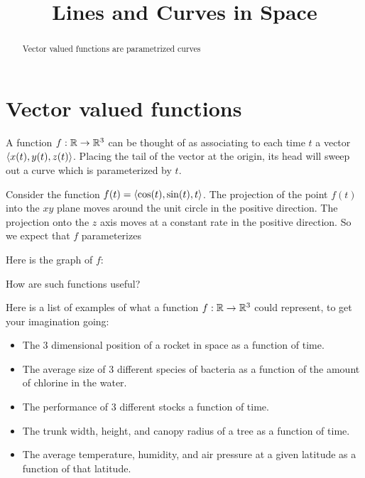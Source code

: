 \documentclass{ximera}
\title[Dig-In:]{Lines and Curves in Space}
\begin{document}
\begin{abstract}
  Vector valued functions are parametrized curves
\end{abstract}
\maketitle

\section{Vector valued functions}

A function $f: \mathbb R \to \mathbb R^3$ can be thought of as associating to each time $t$ a vector $\left\langle x(t),y(t),z(t)\right\rangle$.  Placing the tail of the vector at the origin, its head will sweep out a curve which is parameterized by $t$.

\begin{example}
	Consider the function $f(t) = \left\langle \cos(t),\sin(t),t\right\rangle$.  The projection of the point $f(t)$ into the $xy$ plane moves around the unit circle in the positive direction.  The projection onto the $z$ axis moves at a constant rate in the positive direction.  So we expect that $f$ parameterizes
	
	\begin{multipleChoice}
	\end{multipleChoice}
	
	\begin{feedback}
		Here is the graph of $f$:
		
	\end{feedback}

\end{example}

How are such functions useful?

Here is a list of examples of what a function  $f: \mathbb R \to \mathbb R^3$ could represent, to get your imagination going:

	\begin{itemize}
		\item The $3$ dimensional position of a rocket in space as a function of time. 
		\item The average size of $3$ different species of bacteria as a function of the amount of chlorine in the water.
		\item The performance of $3$ different stocks a function of time.
		\item The trunk width, height, and canopy radius of a tree as a function of time.
		\item The average temperature, humidity, and air pressure at a given latitude as a function of that latitude.
	\end{itemize}
	
\end{document}

